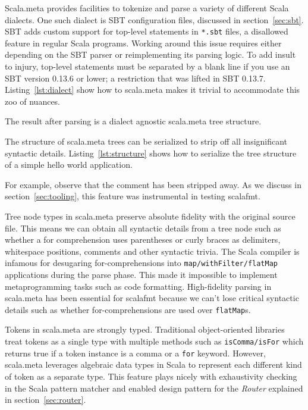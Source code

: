 Scala.meta provides facilities to tokenize and parse a variety of different Scala dialects.
One such dialect is SBT configuration files, discussed in section~\ref{sec:sbt}.
SBT adds custom support for top-level statements in \texttt{*.sbt} files, a disallowed feature in regular Scala programs.
Working around this issue requires either depending on the SBT parser or reimplementing its parsing logic.
To add insult to injury, top-level statements must be separated by a blank line if you use an SBT version 0.13.6 or lower; a restriction that was lifted in SBT 0.13.7.
Listing~\ref{lst:dialect} show how to scala.meta makes it trivial to accommodate this zoo of nuances.

The result after parsing is a dialect agnostic scala.meta tree structure.

The structure of scala.meta trees can be serialized to strip off all insignificant syntactic details.
Listing~\ref{lst:structure} shows how to serialize the tree structure of a simple hello world application.

For example, observe that the comment has been stripped away.
As we discuss in section~\ref{sec:tooling}, this feature was instrumental in testing scalafmt.

Tree node types in scala.meta preserve absolute fidelity with the original source file.
This means we can obtain all syntactic details from a tree node such as whether a for comprehension uses parentheses or curly braces as delimiters, whitespace positions, comments and other syntactic trivia.
The Scala compiler is infamous for desugaring for-comprehensions into \texttt{map/withFilter/flatMap} applications during the parse phase.
This made it impossible to implement metaprogramming tasks such as code formatting.
High-fidelity parsing in scala.meta has been essential for scalafmt because we can't lose critical syntactic details such as whether for-comprehensions are used over \texttt{flatMap}s.

Tokens in scala.meta are strongly typed.
Traditional object-oriented libraries treat tokens as a single type with multiple methods such as \texttt{isComma/isFor} which returns true if a token instance is a comma or a \texttt{for} keyword.
However, scala.meta leverages algebraic data types in Scala to represent each different kind of token as a separate type.
This feature plays nicely with exhaustivity checking in the Scala pattern matcher and enabled design pattern for the \emph{Router} explained in section~\ref{sec:router}.


